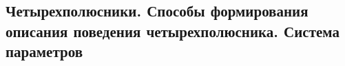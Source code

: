 \subsection{Четырехполюсники. Способы формирования описания поведения четырехполюсника. Система параметров}

\begin{center}
	\begin{figure}[h!]
		\caption{}	\end{figure}
\end{center}
\begin{center}
	\begin{figure}[h!]
		\caption{}	
	\end{figure}
\end{center}



\pagebreak